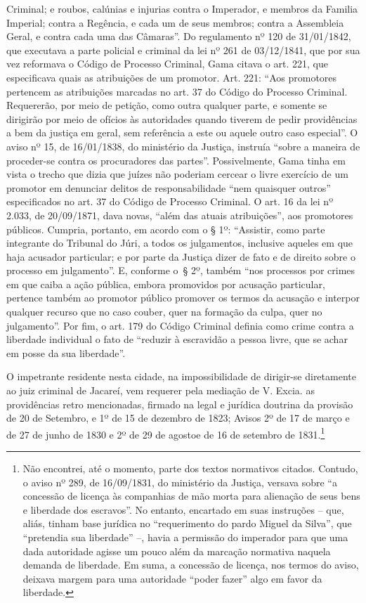 {\begin{flushright}
{  Criminal; e roubos, calúnias e injurias contra o Imperador, e membros
  da Familia Imperial; contra a Regência, e cada um de seus membros;
  contra a Assembleia Geral, e contra cada uma das Câmaras''. Do
  regulamento nº 120 de 31/01/1842, que executava a parte policial e
  criminal da lei nº 261 de 03/12/1841, que por sua vez reformava o
  Código de Processo Criminal, Gama citava o art. 221, que especificava
  quais as atribuições de um promotor. Art. 221: ``Aos promotores
  pertencem as atribuições marcadas no art. 37 do Código do Processo
  Criminal. Requererão, por meio de petição, como outra qualquer parte,
  e somente se dirigirão por meio de ofícios às autoridades quando
  tiverem de pedir providências a bem da justiça em geral, sem
  referência a este ou aquele outro caso especial''. O aviso nº 15, de
  16/01/1838, do ministério da Justiça, instruía ``sobre a maneira de
  proceder-se contra os procuradores das partes''. Possivelmente, Gama
  tinha em vista o trecho que dizia que juízes não poderiam cercear o
  livre exercício de um promotor em denunciar delitos de
  responsabilidade ``nem quaisquer outros'' especificados no art. 37 do
  Código de Processo Criminal. O art. 16 da lei nº 2.033, de 20/09/1871,
  dava novas, ``além das atuais atribuições'', aos promotores públicos.
  Cumpria, portanto, em acordo com o § 1º: ``Assistir, como parte
  integrante do Tribunal do Júri, a todos os julgamentos, inclusive
  aqueles em que haja acusador particular; e por parte da Justiça dizer
  de fato e de direito sobre o processo em julgamento''. E, conforme o~§
  2º, também ``nos processos por crimes em que caiba a ação pública,
  embora promovidos por acusação particular, pertence também ao promotor
  público promover os termos da acusação e interpor qualquer recurso que
  no caso couber, quer na formação da culpa, quer no julgamento''. Por
  fim, o art. 179 do Código Criminal definia como crime contra a
  liberdade individual o fato de ``reduzir à escravidão a pessoa livre,
  que se achar em posse da sua liberdade''.}

O impetrante residente nesta cidade, na impossibilidade de dirigir-se
diretamente ao juiz criminal de Jacareí, vem requerer pela mediação de
V. Excia. as providências retro mencionadas, firmado na legal e jurídica
doutrina da provisão de 20 de Setembro, e 1º de 15 de dezembro de 1823;
Avisos 2º de 17 de março e de 27 de junho de 1830 e 2º de 29 de agostoe
de 16 de setembro de 1831.\footnote{ Não encontrei, até o momento,
  parte dos textos normativos citados. Contudo, o aviso nº 289, de
  16/09/1831, do ministério da Justiça, versava sobre ``a concessão de
  licença às companhias de mão morta para alienação de seus bens e
  liberdade dos escravos''. No entanto, encartado em suas instruções --
  que, aliás, tinham base jurídica no ``requerimento do pardo Miguel da
  Silva'', que ``pretendia sua liberdade'' --, havia a permissão do
  imperador para que uma dada autoridade agisse um pouco além da
  marcação normativa naquela demanda de liberdade. Em suma, a concessão
  de licença, nos termos do aviso, deixava margem para uma autoridade
  ``poder fazer'' algo em favor da liberdade.}


\end{flushright}}
